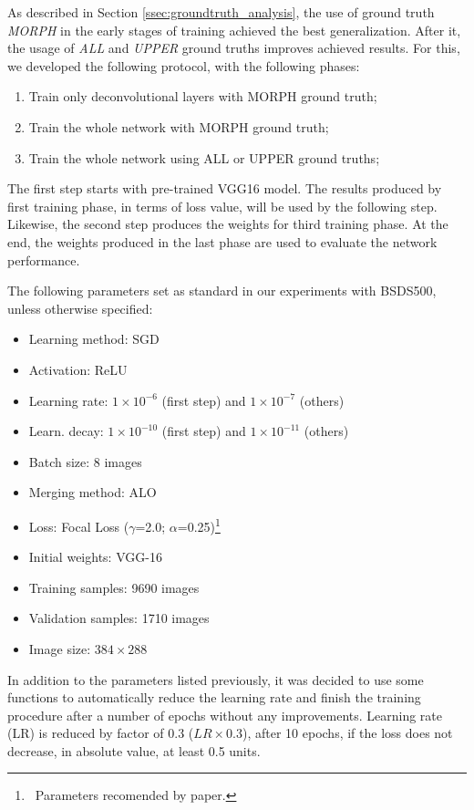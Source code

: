 As described in Section \ref{ssec:groundtruth_analysis}, the use of ground truth \textit{MORPH} in the early stages of training achieved the best generalization.
After it, the usage of \textit{ALL} and \textit{UPPER} ground truths improves achieved results.
For this, we developed the following protocol, with the following phases:

\begin{enumerate}
    \item Train only deconvolutional layers with MORPH ground truth;
    \item Train the whole network with MORPH ground truth;
    \item Train the whole network using ALL or UPPER ground truths;
\end{enumerate}

The first step starts with pre-trained VGG16 model.
The results produced by first training phase, in terms of loss value, will be used by the following step.
Likewise, the second step produces the weights for third training phase.
At the end, the weights produced in the last phase are used to evaluate the network performance.

The following parameters set as standard in our experiments with BSDS500, unless otherwise specified:
\begin{itemize}
    \item Learning method: SGD
    \item Activation: ReLU
    \item Learning rate: $1 \times 10^{-6}$ (first step) and $1 \times 10^{-7}$ (others)
    \item Learn. decay: $1 \times 10^{-10}$ (first step) and $1 \times 10^{-11}$ (others)
    \item Batch size: 8 images
    \item Merging method: ALO
    \item Loss: Focal Loss ($\gamma$=2.0; $\alpha$=0.25)\footnote{~Parameters recomended by  paper.}
    \item Initial weights: VGG-16
    \item Training samples: 9690 images 
    \item Validation samples: 1710 images
    \item Image size: $384 \times 288$
\end{itemize}

In addition to the parameters listed previously, it was decided to use some functions to automatically reduce the learning rate and finish the training procedure after a number of epochs without any improvements. 
Learning rate (LR) is reduced by factor of 0.3 ($LR \times 0.3$), after 10 epochs, if the loss does not decrease, in absolute value, at least 0.5 units.

